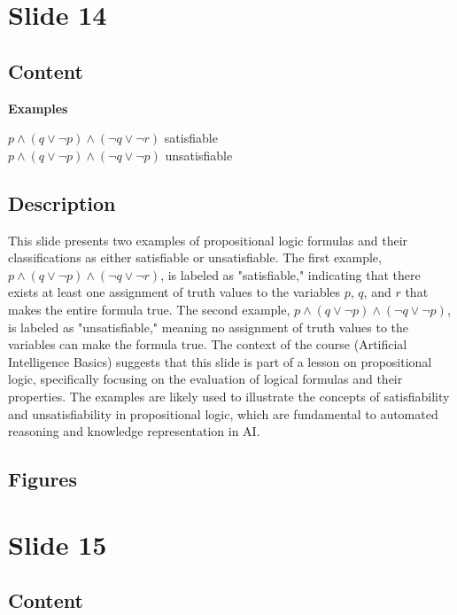 \documentclass{article}%
\begin{document}
%
\newpage%
\section{Slide 14}%
\label{sec:Slide14}%
\subsection{Content}%

\textbf{Examples}

$p \land (q \lor \neg p) \land (\neg q \lor \neg r)$ \quad satisfiable \\
$p \land (q \lor \neg p) \land (\neg q \lor \neg p)$ \quad unsatisfiable
%
\subsection{Description}%
This slide presents two examples of propositional logic formulas and their classifications as either satisfiable or unsatisfiable.  The first example, $p \land (q \lor \neg p) \land (\neg q \lor \neg r)$, is labeled as "satisfiable," indicating that there exists at least one assignment of truth values to the variables $p$, $q$, and $r$ that makes the entire formula true. The second example, $p \land (q \lor \neg p) \land (\neg q \lor \neg p)$, is labeled as "unsatisfiable," meaning no assignment of truth values to the variables can make the formula true.  The context of the course (Artificial Intelligence Basics) suggests that this slide is part of a lesson on propositional logic, specifically focusing on the evaluation of logical formulas and their properties.  The examples are likely used to illustrate the concepts of satisfiability and unsatisfiability in propositional logic, which are fundamental to automated reasoning and knowledge representation in AI.%
\subsection{Figures}%
\begin{figure}[H]%
\centering%
\end{figure}

%
\newpage%
\section{Slide 15}%
\label{sec:Slide15}%
\subsection{Content}%
\end{document}
